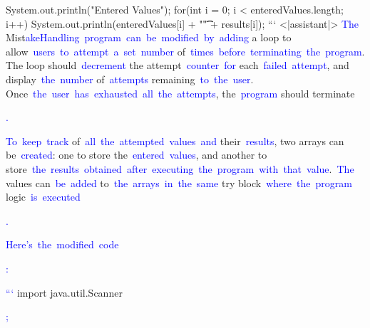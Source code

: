 \documentclass{article}
\begin{document}
\begin{tcolorbox}[colframe=black,colback=white]
{{        System.out.println("Entered Values\tResult");
        for(int i = 0; i < enteredValues.length; i++) {
            System.out.println(enteredValues[i] + "\t\t" + results[i]);
        }
    }
}
```
<|assistant|>
\textcolor{blue}{The} Mist\textcolor{blue}{ake}\textcolor{blue}{Handling}\textcolor{blue}{~program}\textcolor{blue}{~can}\textcolor{blue}{~be}\textcolor{blue}{~modified}\textcolor{blue}{~by}\textcolor{blue}{~adding} a loop to allow\textcolor{blue}{~users}\textcolor{blue}{~to}\textcolor{blue}{~attempt}\textcolor{blue}{~a}\textcolor{blue}{~set}\textcolor{blue}{~number} of\textcolor{blue}{~times}\textcolor{blue}{~before}\textcolor{blue}{~terminating}\textcolor{blue}{~the}\textcolor{blue}{~program}. The loop should\textcolor{blue}{~decrement} the attempt\textcolor{blue}{~counter}\textcolor{blue}{~for} each\textcolor{blue}{~failed}\textcolor{blue}{~attempt}, and display\textcolor{blue}{~the}\textcolor{blue}{~number} of\textcolor{blue}{~attempts} remaining\textcolor{blue}{~to}\textcolor{blue}{~the}\textcolor{blue}{~user}. Once\textcolor{blue}{~the}\textcolor{blue}{~user}\textcolor{blue}{~has}\textcolor{blue}{~exhausted}\textcolor{blue}{~all}\textcolor{blue}{~the}\textcolor{blue}{~attempts}, the\textcolor{blue}{~program} should terminate\textcolor{blue}{.

}\textcolor{blue}{To}\textcolor{blue}{~keep}\textcolor{blue}{~track} of\textcolor{blue}{~all}\textcolor{blue}{~the}\textcolor{blue}{~attempted}\textcolor{blue}{~values}\textcolor{blue}{~and} their\textcolor{blue}{~results}, two arrays can be\textcolor{blue}{~created}: one to store the\textcolor{blue}{~entered}\textcolor{blue}{~values}, and another to store\textcolor{blue}{~the}\textcolor{blue}{~results}\textcolor{blue}{~obtained}\textcolor{blue}{~after}\textcolor{blue}{~executing}\textcolor{blue}{~the}\textcolor{blue}{~program}\textcolor{blue}{~with}\textcolor{blue}{~that}\textcolor{blue}{~value}.\textcolor{blue}{~The} values can\textcolor{blue}{~be}\textcolor{blue}{~added} to\textcolor{blue}{~the}\textcolor{blue}{~arrays}\textcolor{blue}{~in}\textcolor{blue}{~the}\textcolor{blue}{~same} try block\textcolor{blue}{~where}\textcolor{blue}{~the}\textcolor{blue}{~program} logic\textcolor{blue}{~is}\textcolor{blue}{~executed}\textcolor{blue}{.

}\textcolor{blue}{Here}\textcolor{blue}{'s}\textcolor{blue}{~the}\textcolor{blue}{~modified}\textcolor{blue}{~code}\textcolor{blue}{:

}\textcolor{blue}{```}\textcolor{blue}{
}import java.util.Scanner\textcolor{blue}{;

}
\end{tcolorbox}
\end{document}

